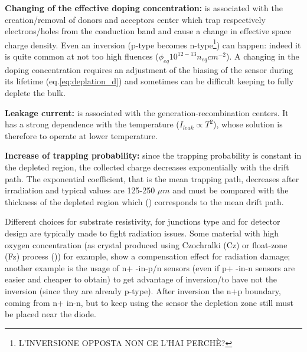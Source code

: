     \textbf{Changing of the effective doping concentration:} is associated with the creation/removal of donors and acceptors center which trap respectively electrons/holes from the conduction band and cause a change in effective space charge density. Even an inversion (p-type becomes n-type\footnote{L'INVERSIONE OPPOSTA NON CE L'HAI PERCHÈ?}) can happen: indeed it is quite common at not too high fluences ($\phi_{eq} 10^{12-13}n_{eq}cm^{-2}$). 
    A changing in the doping concentration requires an adjustment of the biasing of the sensor during its lifetime (eq.\ref{eq:deplation_d}) and sometimes can be difficult keeping to fully deplete the bulk.

    \textbf{Leakage current:} is associated with the generation-recombination centers. It has a strong dependence with the temperature ($I_{leak}\propto T^2$), whose solution is therefore to operate at lower temperature.

    \textbf{Increase of trapping probability:} since the trapping probability is constant in the depleted region, the collected charge decreases exponentially with the drift path. The exponential coefficient, that is the mean trapping path, decreases after irradiation and typical values are 125-250 $\mu m$ and must be compared with the thickness of the depleted region which () corresponds to the mean drift path.

    Different choices for substrate resistivity, for junctions type and for detector design are typically made to fight radiation issues. Some material with high oxygen concentration (as crystal produced using Czochralki (Cz) or float-zone (Fz) process ()) for example, show a compensation effect for radiation damage; another example is the usage of n+ -in-p/n sensors (even if p+ -in-n sensors are easier and cheaper to obtain) to get advantage of inversion/to have not the inversion (since they are already p-type). After inversion the n+p boundary, coming from n+ in-n, but to keep using the sensor the depletion zone still must be placed near the diode.
    
